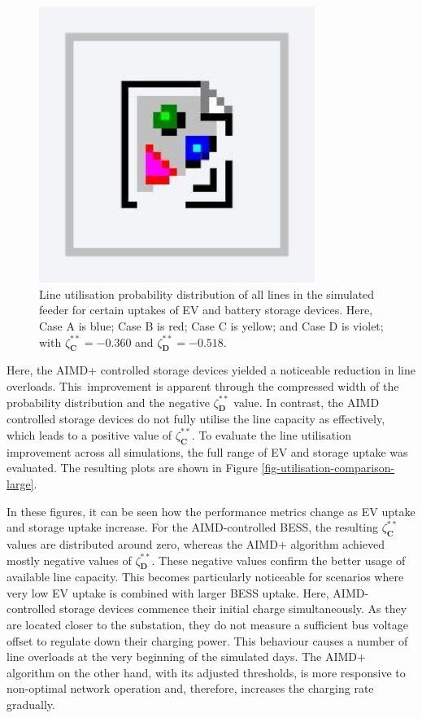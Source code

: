 \begin{figure}\centering
 \includegraphics[width=0.8\textwidth]{foo}
 \caption{Line utilisation probability distribution of all lines in the simulated feeder for certain uptakes of EV and battery storage devices. Here, Case {A} is blue; Case {B} is red; Case {C} is yellow; and Case {D} is violet; with $\zeta_\textbf{C}^{**} = -0.360$ and $\zeta_\textbf{D}^{**} = -0.518$.}
 \label{fig-line-utilisation-excerpt}
\end{figure}

Here, the AIMD+ controlled storage devices yielded a noticeable reduction in line overloads. This~improvement is apparent through the compressed width of the probability distribution and the negative $\zeta_\textbf{D}^{**}$ value. In contrast, the AIMD controlled storage devices do not fully utilise the line capacity as effectively, which leads to a positive value of $\zeta_\textbf{C}^{**}$. To evaluate the line utilisation improvement across all simulations, the full range of EV and storage uptake was evaluated. The resulting plots are shown in Figure \ref{fig-utilisation-comparison-large}.

In these figures, it can be seen how the performance metrics change as EV uptake and storage uptake increase. For the AIMD-controlled BESS, the resulting $\zeta_\textbf{C}^{**}$ values are distributed around zero, whereas the AIMD+ algorithm achieved mostly negative values of $\zeta_\textbf{D}^{**}$. These negative values confirm the better usage of available line capacity. This becomes particularly noticeable for scenarios where very low EV uptake is combined with larger BESS uptake. Here, AIMD-controlled storage devices commence their initial charge simultaneously. As they are located closer to the substation, they do not measure a sufficient bus voltage offset to regulate down their charging power. This behaviour causes a number of line overloads at the very beginning of the simulated days. The AIMD+ algorithm on the other hand, with its adjusted thresholds, is more responsive to non-optimal network operation and, therefore, increases the charging rate gradually.

